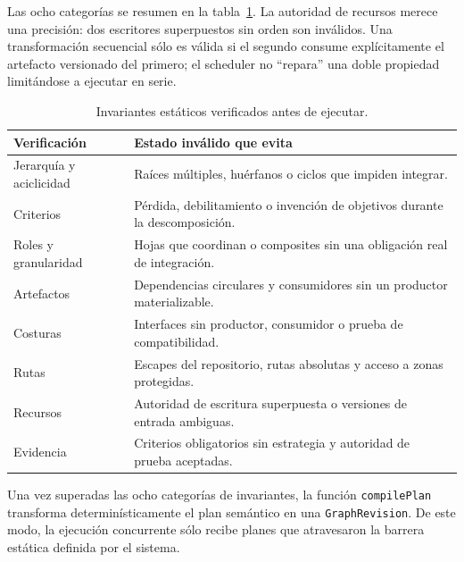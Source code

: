 Las ocho categorías se resumen en la tabla~\ref{tab:invariantes-plan}. La
autoridad de recursos merece una precisión: dos escritores superpuestos sin
orden son inválidos. Una transformación secuencial sólo es válida si el segundo
consume explícitamente el artefacto versionado del primero; el scheduler no
``repara'' una doble propiedad limitándose a ejecutar en serie.

\begin{table}[H]
  \centering
  \caption{Invariantes estáticos verificados antes de ejecutar.}
  \label{tab:invariantes-plan}
  \scriptsize
  \begin{tabularx}{\textwidth}{@{}p{3.1cm} X@{}}
    \toprule
    \textbf{Verificación} & \textbf{Estado inválido que evita} \\
    \midrule
    Jerarquía y aciclicidad & Raíces múltiples, huérfanos o ciclos que impiden integrar. \\
    Criterios & Pérdida, debilitamiento o invención de objetivos durante la descomposición. \\
    Roles y granularidad & Hojas que coordinan o composites sin una obligación real de integración. \\
    Artefactos & Dependencias circulares y consumidores sin un productor materializable. \\
    Costuras & Interfaces sin productor, consumidor o prueba de compatibilidad. \\
    Rutas & Escapes del repositorio, rutas absolutas y acceso a zonas protegidas. \\
    Recursos & Autoridad de escritura superpuesta o versiones de entrada ambiguas. \\
    Evidencia & Criterios obligatorios sin estrategia y autoridad de prueba aceptadas. \\
    \bottomrule
  \end{tabularx}
\end{table}

Una vez superadas las ocho categorías de invariantes, la función \texttt{compilePlan} transforma determinísticamente el plan semántico en una \texttt{GraphRevision}. De este modo, la ejecución concurrente sólo recibe planes que atravesaron la barrera estática definida por el sistema.
